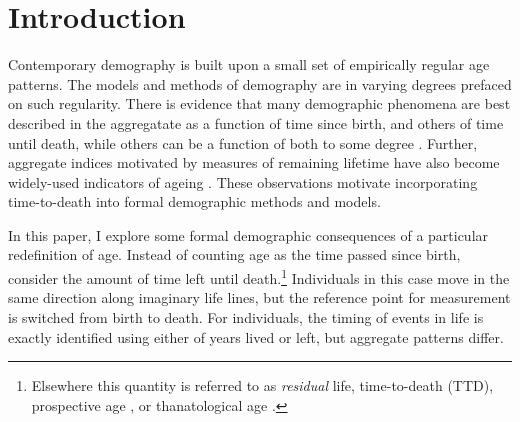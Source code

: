 \documentclass[12pt,oneside,a4paper,leqno]{article}
\begin{document}
\section*{Introduction}
Contemporary demography is built upon a small set of empirically regular age
patterns. The models and methods
of demography are in varying degrees prefaced on such regularity. There is evidence that many demographic phenomena are best described in the
aggregatate as a function of time since birth, and others of time until death,
while others can be a function of both to some degree
\citep{riffe2015ttd,wolf2015disability}. Further, aggregate indices
motivated by measures of remaining lifetime have also become widely-used
indicators of ageing \citep{sanderson2007new}. These observations motivate
incorporating time-to-death into formal demographic methods and models.

In this paper, I explore some formal demographic consequences of a particular
redefinition of age. Instead of counting age as the time passed since birth,
consider the amount of time left until death.\footnote{Elsewhere this quantity
is referred to as \textit{residual} life, time-to-death (TTD), prospective
age \citep{sanderson2007new}, or thanatological age \citep{riffe2015force}.}
Individuals in this case move in the same direction along imaginary life lines,
but the reference point for measurement is switched from birth to death. For
individuals, the timing of events in life is exactly identified using either of
years lived or left, but aggregate patterns differ.
\end{document}
